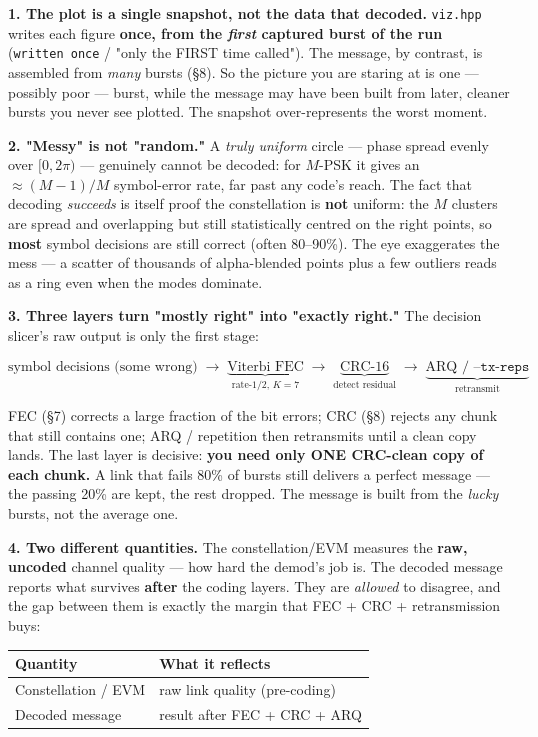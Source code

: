 \documentclass[
  10pt,
]{article}
\begin{document}
\textbf{1. The plot is a single snapshot, not the data that decoded.}
\texttt{viz.hpp} writes each figure \textbf{once, from the \emph{first}
captured burst of the run} (\texttt{written\ once} / "only the FIRST
time called"). The message, by contrast, is assembled from \emph{many}
bursts (§8). So the picture you are staring at is one --- possibly poor
--- burst, while the message may have been built from later, cleaner
bursts you never see plotted. The snapshot over-represents the worst
moment.

\textbf{2. "Messy" is not "random."} A \emph{truly uniform} circle ---
phase spread evenly over \([0, 2\pi)\) --- genuinely cannot be decoded:
for \(M\)-PSK it gives an \(\approx (M-1)/M\) symbol-error rate, far
past any code's reach. The fact that decoding \emph{succeeds} is itself
proof the constellation is \textbf{not} uniform: the \(M\) clusters are
spread and overlapping but still statistically centred on the right
points, so \textbf{most} symbol decisions are still correct (often
80--90\%). The eye exaggerates the mess --- a scatter of thousands of
alpha-blended points plus a few outliers reads as a ring even when the
modes dominate.

\textbf{3. Three layers turn "mostly right" into "exactly right."} The
decision slicer's raw output is only the first stage:

\[\text{symbol decisions (some wrong)} \;\to\; \underbrace{\text{Viterbi FEC}}_{\text{rate-}1/2,\,K=7} \;\to\; \underbrace{\text{CRC-16}}_{\text{detect residual}} \;\to\; \underbrace{\text{ARQ / }\texttt{--tx-reps}}_{\text{retransmit}}\]

FEC (§7) corrects a large fraction of the bit errors; CRC (§8) rejects
any chunk that still contains one; ARQ / repetition then retransmits
until a clean copy lands. The last layer is decisive: \textbf{you need
only ONE CRC-clean copy of each chunk.} A link that fails 80\% of bursts
still delivers a perfect message --- the passing 20\% are kept, the rest
dropped. The message is built from the \emph{lucky} bursts, not the
average one.

\textbf{4. Two different quantities.} The constellation/EVM measures the
\textbf{raw, uncoded} channel quality --- how hard the demod's job is.
The decoded message reports what survives \textbf{after} the coding
layers. They are \emph{allowed} to disagree, and the gap between them is
exactly the margin that FEC + CRC + retransmission buys:

\begin{longtable}[]{@{}ll@{}}
\toprule
Quantity & What it reflects \\
\midrule
\endhead
Constellation / EVM & raw link quality (pre-coding) \\
Decoded message & result after FEC + CRC + ARQ \\
\bottomrule
\end{longtable}
\end{document}
